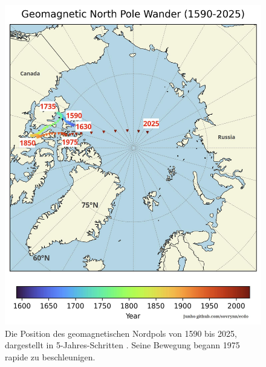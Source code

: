 \documentclass[10pt,twocolumn,letterpaper]{article}
\begin{document}
\begin{figure}[t]
\begin{center}
   \includegraphics[width=1\linewidth]{npw.jpg}
\end{center}
   \caption{Die Position des geomagnetischen Nordpols von 1590 bis 2025, dargestellt in 5-Jahres-Schritten \cite{41}. Seine Bewegung begann 1975 rapide zu beschleunigen.}
\label{fig:13}
\label{fig:onecol}
\end{figure}
\end{document}

